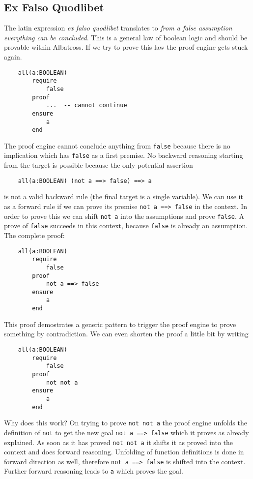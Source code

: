 \subsection{Ex Falso Quodlibet}

The latin expression {\em ex falso quodlibet} translates to {\em from a false
  assumption everything can be concluded}. This is a general law of boolean
logic and should be provable within Albatross. If we try to prove this law the
proof engine gets stuck again.

\begin{lstlisting}
    all(a:BOOLEAN)
        require
            false
        proof
            ...  -- cannot continue
        ensure
            a
        end
\end{lstlisting}

The proof engine cannot conclude anything from \lstinline!false! because there
is no implication which has \lstinline!false! as a first premise. No backward
reasoning starting from the target is possible because the only potential
assertion
\begin{lstlisting}
    all(a:BOOLEAN) (not a ==> false) ==> a
\end{lstlisting}
is not a valid backward rule (the final target is a single variable). We can
use it as a forward rule if we can prove its premise
\lstinline!not a ==> false! in the context. In order to prove this we can
shift \lstinline!not a!  into the assumptions and prove \lstinline!false!. A
prove of \lstinline!false!  succeeds in this context, because
\lstinline!false! is already an assumption. The complete proof:

\begin{lstlisting}
    all(a:BOOLEAN)
        require
            false
        proof
            not a ==> false
        ensure
            a
        end
\end{lstlisting}

This proof demostrates a generic pattern to trigger the proof engine to prove
something by contradiction. We can even shorten the proof a little bit by
writing

\begin{lstlisting}
    all(a:BOOLEAN)
        require
            false
        proof
            not not a
        ensure
            a
        end
\end{lstlisting}

Why does this work? On trying to prove \lstinline!not not a! the proof engine
unfolds the definition of \lstinline!not! to get the new goal
\lstinline!not a ==> false! which it proves as already explained. As soon as
it has proved \lstinline!not not a! it shifts it as proved into the context
and does forward reasoning. Unfolding of function definitions is done in
forward direction as well, therefore \lstinline!not a ==> false! is shifted
into the context. Further forward reasoning leads to \lstinline!a! which
proves the goal.

